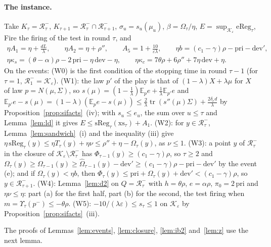 \documentclass[11pt]{amsart}
\theoremstyle{definition}
\numberwithin{equation}{section}
\newcommand{\E}{\mathbb{E}}
\newcommand{\cK}{\mathcal{K}}
\newcommand{\tr}{\operatorname{tr}}
\begin{document}
\paragraph{The instance.} Take $K_\tau=\mathcal R^-_\tau$, $K_{\tau+1}=\mathcal R^-_\tau\cap\mathcal R^-_{\tau+1}$, $\sigma_u=s_u(\mu_u)$, $\beta=\Omega_\tau/\eta$, $E=\sup_{\cK_\varepsilon}\mathrm{eReg}_\tau$, Fire the firing of the test in round $\tau$, and
\begin{gather*}
\eta A_1=\eta+\frac{dL}\lambda,\qquad\eta A_2=\eta+\rho'',\qquad A_5=1+\frac{10}{\varepsilon\lambda},\qquad\eta b=(c_1-\gamma)\rho-\mathrm{pri}-\mathrm{dev}',\\
\eta\kappa_s=(\theta-\alpha)\rho-2\,\mathrm{pri}-\eta\,\mathrm{dev}-\eta,\qquad\eta\kappa_c=7\theta\rho+6\rho''+7\eta\,\mathrm{dev}+\eta .
\end{gather*}
On the events:
(W0) is the first condition of the stopping time in round $\tau-1$ (for $\tau=1$, $\mathcal R^-_1=\cK_\varepsilon$).
(W1): the law $p'$ of the play is that of $(1-\lambda)X+\lambda\mu$ for $X$ of law $p=N(\mu,\Sigma)$, so $s(\mu)=(1-\frac1\lambda)\E_pe+\frac1\lambda\E_{p'}e$ and $\E_{p'}e-s(\mu)=(1-\lambda)(\E_pe-s(\mu))\le\frac2\lambda\tr(s''(\mu)\Sigma)+\frac{2\delta_ed}\lambda$ by Proposition~\ref{prop:sifacts}~(iv); with $s_u\le e_u$, the sum over $u\le\tau$ and Lemma~\ref{lem:ld} it gives $E\le\mathrm{sReg}_\tau(\mathrm{xs}_\tau)+A_1$.
(W2): for $y\in\mathcal R^-_\tau$, Lemma~\ref{lem:sandwich}~(i) and the inequality (iii) give $\eta\,\mathrm{sReg}_\tau(y)\le\eta T_\tau(y)+\eta\nu\le\rho''+\eta-\Omega_\tau(y)$, as $\nu\le1$.
(W3): a point $y$ of $\mathcal R^-_\tau$ in the closure of $\cK_\varepsilon\setminus\mathcal R^-_\tau$ has $\Phi_{\tau-1}(y)\ge(c_1-\gamma)\rho$, so $\tau\ge2$ and $\Omega_\tau(y)\ge\Omega_{\tau-1}(y)\ge\hat\Omega_{\tau-1}(y)-\mathrm{dev}'\ge(c_1-\gamma)\rho-\mathrm{pri}-\mathrm{dev}'$ by the event (e); and if $\Omega_\tau(y)<\eta b$, then $\Phi_\tau(y)\le\mathrm{pri}+\Omega_\tau(y)+\mathrm{dev}'<(c_1-\gamma)\rho$, so $y\in\mathcal R^-_{\tau+1}$.
(W4): Lemma~\ref{lem:d2} on $Q=\mathcal R^-_\tau$ with $h=\theta\rho$, $e=\alpha\rho$, $\pi_0=2\,\mathrm{pri}$ and $\eta\nu\le\eta$: part (a) for the first half, part (b) for the second, the test firing when $m=\Upsilon_\tau(p^-)\le-\theta\rho$.
(W5): $-10/(\lambda\varepsilon)\le s_\tau\le1$ on $\cK_\varepsilon$ by Proposition~\ref{prop:sifacts}~(iii).

The proofs of Lemmas~\ref{lem:events}, \ref{lem:closure}, \ref{lem:ib2} and~\ref{lem:z} use the next lemma.
\end{document}

